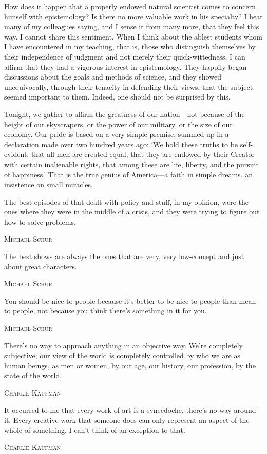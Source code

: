 \documentclass[../butidigress.tex]{subfiles}
\begin{document}
\par\postepi
\epigraph{How does it happen that a properly endowed natural scientist comes to concern himself with epistemology? Is there no more valuable work in his specialty? I hear many of my colleagues saying, and I sense it from many more, that they feel this way. I cannot share this sentiment. When I think about the ablest students whom I have encountered in my teaching, that is, those who distinguish themselves by their independence of judgment and not merely their quick-wittedness, I can affirm that they had a vigorous interest in epistemology. They happily began discussions about the goals and methods of science, and they showed unequivocally, through their tenacity in defending their views, that the subject seemed important to them. Indeed, one should not be surprised by this.}{}
\postepi
\epigraph{Tonight, we gather to affirm the greatness of our nation---not because of the height of our skyscrapers, or the power of our military, or the size of our economy. Our pride is based on a very simple premise, summed up in a declaration made over two hundred years ago: `We hold these truths to be self-evident, that all men are created equal, that they are endowed by their Creator with certain inalienable rights, that among these are life, liberty, and the pursuit of happiness.' That is the true genius of America---a faith in simple dreams, an insistence on small miracles.}{}
\postepi
\epigraph{The best episodes of  that dealt with policy and stuff, in my opinion, were the ones where they were in the middle of a crisis, and they were trying to figure out how to solve problems.}{\textsc{Michael Schur}}
\postepi
\epigraph{The best shows are always the ones that are very, very low-concept and just about great characters.}{\textsc{Michael Schur}}
\postepi
\epigraph{You should be nice to people because it's better to be nice to people than mean to people, not because you think there's something in it for you.}{\textsc{Michael Schur}}
\postepi
\epigraph{There's no way to approach anything in an objective way. We're completely subjective; our view of the world is completely controlled by who we are as human beings, as men or women, by our age, our history, our profession, by the state of the world.}{\textsc{Charlie Kaufman}}
\postepi
\epigraph{It occurred to me that every work of art is a synecdoche, there's no way around it. Every creative work that someone does can only represent an aspect of the whole of something. I can't think of an exception to that.}{\textsc{Charlie Kaufman}}
\end{document}

